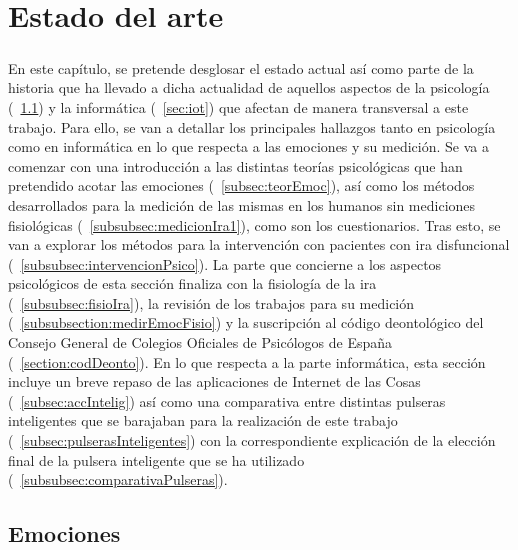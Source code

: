 %
%

\chapter{Estado del arte}

\paragraph{}
En este capítulo, se pretende desglosar el estado actual así como parte de la historia que ha llevado a dicha actualidad de aquellos aspectos de la psicología (~\ref{cap1:sec:Emociones}) y la informática (~\ref{sec:iot}) que afectan de manera transversal a este trabajo. Para ello, se van a detallar los principales hallazgos tanto en psicología como en informática en lo que respecta a las emociones y su medición. Se va a comenzar con una introducción a las distintas teorías psicológicas que han pretendido acotar las emociones (~\ref{subsec:teorEmoc}), así como los métodos desarrollados para la medición de las mismas en los humanos sin mediciones fisiológicas (~\ref{subsubsec:medicionIra1}), como son los cuestionarios. Tras esto, se van a explorar los métodos para la intervención con pacientes con ira disfuncional (~\ref{subsubsec:intervencionPsico}). La parte que concierne a los aspectos psicológicos de esta sección finaliza con la fisiología de la ira (~\ref{subsubsec:fisioIra}), la revisión de los trabajos para su medición (~\ref{subsubsection:medirEmocFisio}) y la suscripción al código deontológico del Consejo General de Colegios Oficiales de Psicólogos de España (~\ref{section:codDeonto}). En lo que respecta a la parte informática, esta sección incluye un breve repaso de las aplicaciones de Internet de las Cosas (~\ref{subsec:accIntelig}) así como una comparativa entre distintas pulseras inteligentes que se barajaban para la realización de este trabajo (~\ref{subsec:pulserasInteligentes}) con la correspondiente explicación de la elección final de la pulsera inteligente que se ha utilizado (~\ref{subsubsec:comparativaPulseras}).

\section{Emociones}
\label{cap1:sec:Emociones}

